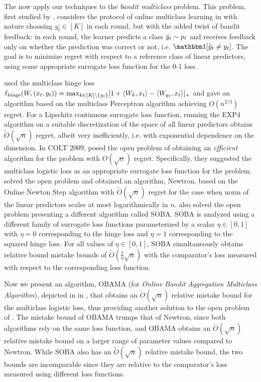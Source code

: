 The now apply our techniques to the \emph{bandit multiclass} problem. This problem, first studied by \citet{kakade2008efficient}, considers the protocol of online multiclass learning in  with nature choosing $y_t \in [K]$ in each round, but with the added twist of bandit feedback: in each round, the learner predicts a class $\yh_t \sim p_t$ and receives feedback only on whether the prediction was correct or not, i.e. $\ind[\hy_t \neq y_t]$. The goal is to minimize regret with respect to a reference class of linear predictors, using some appropriate surrogate loss function for the 0-1 loss. 

\citet{kakade2009complexity} used the multiclass hinge loss $\ell_\text{hinge}(W, (x_t, y_t)) = \max_{k \in [K] \setminus \{y_t\}}[1 + \tri*{W_k, x_t} - \tri*{W_{y_t}, x_t}]_+$ and gave an algorithm based on the multiclass Perceptron algorithm achieving $O(n^{2/3})$ regret. For a Lipschitz continuous surrogate loss function, running the EXP4 algorithm \citep{auer2002nonstochastic} on a suitable discretization of the space of all linear predictors obtains $\tilde{O}(\sqrt{n})$ regret, albeit very inefficiently, i.e. with exponential dependence on the dimension. 
In COLT 2009, \citet{abernethyR09a} posed the open problem of obtaining an {\em efficient} algorithm for the problem with $O(\sqrt{n})$ regret. Specifically, they suggested the multiclass logistic loss as an appropriate surrogate loss function for the problem. \citet{hazan2011newtron} solved the open problem and obtained an algorithm, Newtron,  based on the Online Newton Step algorithm \citep{hazan2007logarithmic} with $\tilde{O}(\sqrt{n})$ regret for the case when norm of the linear predictors scales at most logarithmically in $n$. \citet{beygelzimerOZ17} also solved the open problem presenting a different algorithm called SOBA. SOBA is analyzed using a different family of surrogate loss functions parameterized by a scalar $\eta \in [0, 1]$ with $\eta = 0$ corresponding to the hinge loss and $\eta = 1$ corresponding to the squared hinge loss. For all values of $\eta \in [0, 1]$, SOBA simultaneously obtains relative bound mistake bounds of $\tilde{O}(\frac{1}{\eta}\sqrt{n})$ with the comparator's loss measured with respect to the corresponding loss function. 

Now we present an algorithm, OBAMA (for {\em Online Bandit Aggregation Multiclass Algorithm}), depicted in  in , that obtains an $\tilde{O}(\sqrt{n})$ relative mistake bound for the multiclass logistic loss, thus providing another solution to the open problem of \citet{abernethyR09a}. The mistake bound of OBAMA trumps that of Newtron, since both algorithms rely on the same loss function, and OBAMA obtains an $\tilde{O}(\sqrt{n})$ relative mistake bound on a larger range of parameter values compared to Newtron. While SOBA also has an $\tilde{O}(\sqrt{n})$ relative mistake bound, the two bounds are incomparable since they are relative to the comparator's loss measured using different loss functions.

